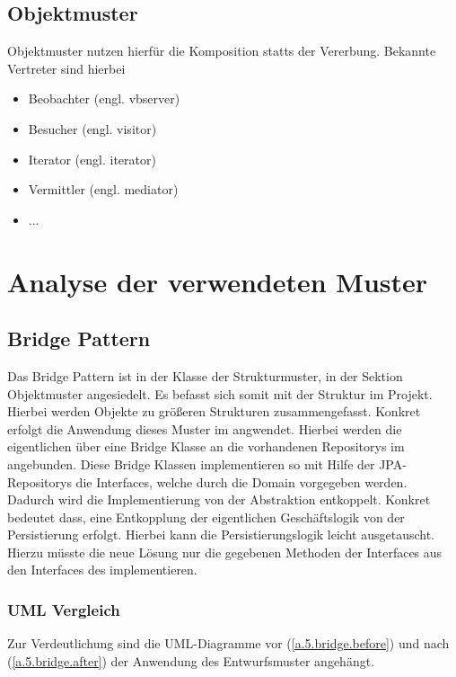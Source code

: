 			\subsection{Objektmuster}
			Objektmuster nutzen hierfür die Komposition statts der Vererbung. Bekannte Vertreter sind hierbei
			\begin{itemize}
				\item Beobachter (engl. vbserver)
				\item Besucher (engl. visitor)
				\item Iterator (engl. iterator)
				\item Vermittler (engl. mediator) %
				\item ...
			\end{itemize}
		
	\section{Analyse der verwendeten Muster}
		\subsection{Bridge Pattern} \label{5.bridge}
		Das Bridge Pattern ist in der Klasse der Strukturmuster, in der Sektion Objektmuster angesiedelt. Es befasst sich somit mit der Struktur im Projekt. Hierbei werden Objekte zu größeren Strukturen zusammengefasst. Konkret erfolgt die Anwendung dieses Muster im  angwendet. Hierbei werden die eigentlichen  über eine Bridge Klasse an die vorhandenen Repositorys im  angebunden. Diese Bridge Klassen implementieren so mit Hilfe der JPA-Repositorys die Interfaces, welche durch die Domain vorgegeben werden. \\
		Dadurch wird die Implementierung von der Abstraktion entkoppelt. Konkret bedeutet dass, eine Entkopplung der eigentlichen Geschäftslogik von der Persistierung erfolgt. Hierbei kann die Persistierungslogik leicht ausgetauscht. Hierzu müsste die neue Lösung nur die gegebenen Methoden der Interfaces aus den Interfaces des  implementieren.
	
			\subsubsection{UML Vergleich}
			Zur Verdeutlichung sind die \ac{UML}-Diagramme vor (\cref{a.5.bridge.before}) und nach (\cref{a.5.bridge.after}) der Anwendung des Entwurfsmuster angehängt.
			
